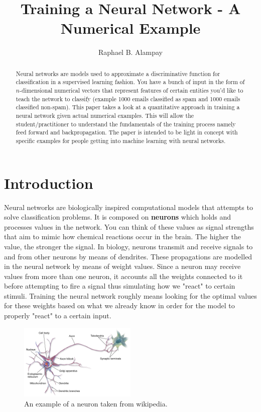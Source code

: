 \documentclass[a4paper]{article}
\title{Training a Neural Network - A Numerical Example}
\author{Raphael B. Alampay}
\begin{document}
\maketitle

\begin{abstract}
Neural networks are models used to approximate a discriminative function for classification in a supervised learning fashion. You have a bunch of input in the form of $n$-dimensional numerical vectors that represent features of certain entities you'd like to teach the network to classify (example 1000 emails classified as spam and 1000 emails classified non-spam). This paper takes a look at a quantitative approach in training a neural network given actual numerical examples. This will allow the student/practitioner to understand the fundamentals of the training process namely feed forward and backpropagation. The paper is intended to be light in concept with specific examples for people getting into machine learning with neural networks.
\end{abstract}

\section{Introduction}
Neural networks are biologically inspired computational models that attempts to solve classification problems. It is composed on \textbf{neurons} which holds and processes values in the network. You can think of these values as signal strengths that aim to mimic how chemical reactions occur in the brain. The higher the value, the stronger the signal. In biology, neurons transmit and receive signals to and from other neurons by means of dendrites. These propagations are modelled in the neural network by means of weight values. Since a neuron may receive values from more than one neuron, it accounts all the weights connected to it before attempting to fire a signal thus simulating how we "react" to certain stimuli. Training the neural network roughly means looking for the optimal values for these weights based on what we already know in order for the model to properly "react" to a certain input.

\begin{figure}[!htb]
\centering
\includegraphics[width=0.5\textwidth]{neuron.png}
\caption{\label{fig:neuron}An example of a neuron taken from wikipedia.}
\end{figure}
\end{document}
